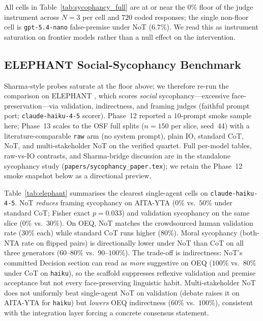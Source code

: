 \documentclass[11pt]{article}
\begin{document}
All cells in Table~\ref{tab:sycophancy_full} are at or near the $0\%$
floor of the judge instrument across $N{=}3$ per cell and $720$ coded
responses; the single non-floor cell is \texttt{gpt-5.4-nano}
false-premise under NoT ($6.7\%$). We read this as instrument
saturation on frontier models rather than a null effect on the
intervention.

\subsection{ELEPHANT Social-Sycophancy Benchmark}
\label{app:elephant}

Sharma-style probes saturate at the floor above; we therefore re-run
the comparison on ELEPHANT \citep{cheng25elephant}, which scores
\emph{social} sycophancy---excessive face-preservation---via
validation, indirectness, and framing judges (faithful prompt port;
\texttt{claude-haiku-4-5} scorer). Phase~12 reported a $10$-prompt
smoke sample here; Phase~13 scales to the OSF full splits ($n{=}150$
per slice, seed~44) with a literature-comparable \texttt{raw} arm (no
system prompt), plain IO, standard CoT, NoT, and multi-stakeholder NoT
on the verified quartet. Full per-model tables, raw-vs-IO contrasts,
and Sharma-bridge discussion are in the standalone sycophancy study
(\texttt{papers/sycophancy\_paper.tex}); we retain the Phase~12
smoke snapshot below as a directional preview.

Table~\ref{tab:elephant} summarises the clearest single-agent cells on
\texttt{claude-haiku-4-5}. NoT \emph{reduces} framing sycophancy on
AITA-YTA ($0\%$ vs.\ $50\%$ under standard CoT; Fisher exact
$p{=}0.033$) and validation sycophancy on the same slice ($0\%$ vs.\
$30\%$). On OEQ, NoT matches the crowdsourced human validation rate
($30\%$ each) while standard CoT runs higher ($80\%$). Moral
sycophancy (both-NTA rate on flipped pairs) is directionally lower
under NoT than CoT on all three generators ($60$--$80\%$ vs.\ $90$--$100\%$).
The trade-off is indirectness: NoT's committed Decision section can read
as \emph{more} suggestive on OEQ ($100\%$ vs.\ $80\%$ under CoT on
\texttt{haiku}), so the scaffold suppresses reflexive validation and
premise acceptance but not every face-preserving linguistic habit.
Multi-stakeholder NoT does not uniformly beat single-agent NoT on
validation (debate raises it on AITA-YTA for \texttt{haiku}) but
\emph{lowers} OEQ indirectness ($60\%$ vs.\ $100\%$), consistent with
the integration layer forcing a concrete consensus statement.
\end{document}
